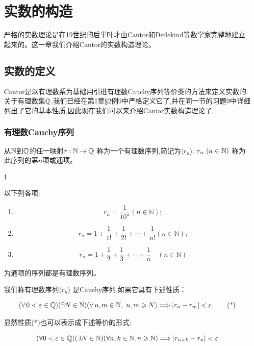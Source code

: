 \chapter{实数的构造}

严格的实数理论是在19世纪的后半叶才由Cantor和Dedekind等数学家完整地建立起来的。这一章我们介绍Cantor的实数构造理论。

\section{实数的定义}

Cantor是以有理数系为基础用引进有理数Cauchy序列等价类的方法来定义实数的.关于有理数集$\mathbb{Q}$,我们已经在第1章§2例9中严格定义它了,并在同一节的习题9中详细列出了它的基本性质,因此现在我们可以来介绍Cantor实数构造理论了.

\subsection{有理数Cauchy序列}


\begin{mydef*}{}

从$\mathbb{N}$到$\mathbb{Q}$的任一映射\(r: \mathbb{N} \to \mathbb{Q}\) 称为一个有理数序列,简记为\(\langle r_n \rangle\). \(r_n\ (n \in \mathbb{N})\) 称为此序列的第$n$项或通项。

\end{mydef*}

\begin{sourceexample}{1}

以下列各项:

\begin{enumerate}[label=\arabic*)]
\item
  \[r_n = \frac{1}{10^n} (n \in \mathbb{N});\]
\item
  \[r_n = 1 + \frac{1}{1!} + \frac{1}{2!} + \cdots + \frac{1}{n!} (n \in \mathbb{N});\]
\item
  \[r_n = 1 + \frac{1}{2} + \frac{1}{3} + \cdots + \frac{1}{n} \quad (n \in \mathbb{N})\]
\end{enumerate}

为通项的序列都是有理数序列。

\end{sourceexample}



\begin{mydef*}{}

我们称有理数序列\(\langle r_n \rangle\) 是Cauchy序列,如果它具有下述性质：

\[(\forall\,0<\varepsilon\in \mathbb{Q})(\exists N\in \mathbb{N})
(\forall\,n,m\in \mathbb{N},\ n,m\geqslant N) \Longrightarrow |r_n - r_m| < \varepsilon. \tag{*} \]

显然性质(*)也可以表示成下述等价的形式:

\[(\forall 0 < \varepsilon \in \mathbb{Q}) (\exists N \in \mathbb{N}) (\forall n, k \in \mathbb{N}, n \geqslant \mathbb{N}) \Longrightarrow |r_{n+k} - r_n| < \varepsilon \]


\end{mydef*}



